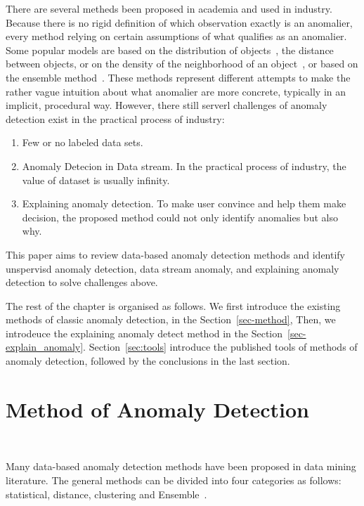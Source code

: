 There are several metheds been proposed in  academia and 
used in industry.
Because there is no rigid definition of which
observation exactly is an anomalier,
every method relying on certain assumptions of
what qualifies as an anomalier.
Some popular models are based on 
the distribution of 
objects~\cite{siripanadorn2010anomaly,chandola2009anomaly,kromanis2013support},
the distance~\cite{knorr1997unified} 
between objects,
or on the density of
the neighborhood of 
an object~\cite{agyemang2004algorithm,breunig2000lof,papadimitriou2003loci},
or based on the ensemble method~\cite{zhou2012ensemble}.
These methods represent different attempts to make
the rather vague intuition about 
what anomalier are more concrete,
typically in an implicit,
procedural way.
However,
there still serverl challenges of anomaly detection exist
in the practical  process of industry:
\begin{enumerate}
    \item Few or no labeled data sets.
    \item Anomaly Detecion in Data stream.
    In the practical process of industry,
    the value of dataset is usually infinity.
    \item Explaining anomaly detection.
    To make  user convince and help them make decision,
    the proposed method could not only identify anomalies  but also
    why.
\end{enumerate}
This paper aims to review data-based anomaly detection methods and
identify unspervisd anomaly detection,
data stream anomaly, and explaining anomaly detection
to solve challenges above.

The rest of the chapter is organised as follows.
We first introduce the existing methods of classic anomaly detection,
in the Section~\ref{sec-method},
Then,
we introdeuce the explaining anomaly detect method
in the Section~\ref{sec-explain_anomaly}.
Section~\ref{sec:tools} introduce the published tools of
methods of anomaly detection,
followed by the conclusions in the last section.

\section{Method of Anomaly Detection}~\label{sec-method}

Many data-based anomaly detection methods have been proposed in
data mining literature.
The general methods can be divided into four categories as follows: 
statistical, 
distance, 
clustering and Ensemble~\cite{cook2019anomaly}.

